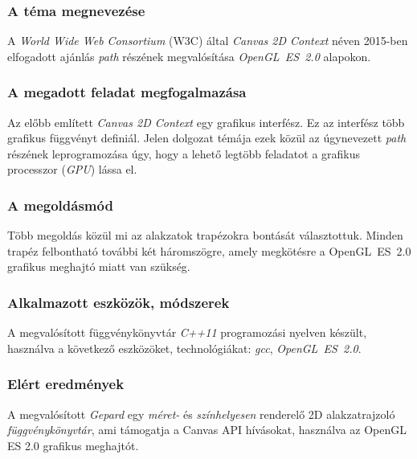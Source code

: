 \documentclass[12pt]{report}
\theoremstyle{definition}
\begin{document}

    \subsubsection*{A téma megnevezése}

A \emph{World Wide Web Consortium} (W3C) által \emph{Canvas 2D Context} néven
2015-ben elfogadott ajánlás \emph{path} részének megvalósítása
\emph{OpenGL~ES~2.0} alapokon.

    \subsubsection*{A megadott feladat megfogalmazása}

Az előbb említett \emph{Canvas 2D Context} egy grafikus interfész. Ez az
interfész több grafikus függvényt definiál. Jelen dolgozat témája ezek közül az
úgynevezett \emph{path} részének leprogramozása úgy, hogy a lehető legtöbb
feladatot a grafikus processzor (\textit{GPU}) lássa el.

    \subsubsection*{A megoldásmód}

Több megoldás közül mi az alakzatok trapézokra bontását választottuk. Minden
trapéz felbontható további két háromszögre, amely megkötésre a OpenGL~ES~2.0
grafikus meghajtó miatt van szükség.

    \subsubsection*{Alkalmazott eszközök, módszerek}

A megvalósított függvénykönyvtár \emph{C++11} programozási nyelven készült,
használva a következő eszközöket, technológiákat: \emph{gcc},
\textit{OpenGL~ES~2.0}.

    \subsubsection*{Elért eredmények}
A megvalósított \emph{Gepard} egy \emph{méret-} és \emph{színhelyesen}
renderelő 2D alakzatrajzoló \emph{függvénykönyvtár}, ami támogatja a Canvas API
hívásokat, használva az OpenGL ES 2.0 grafikus meghajtót.
\end{document}
